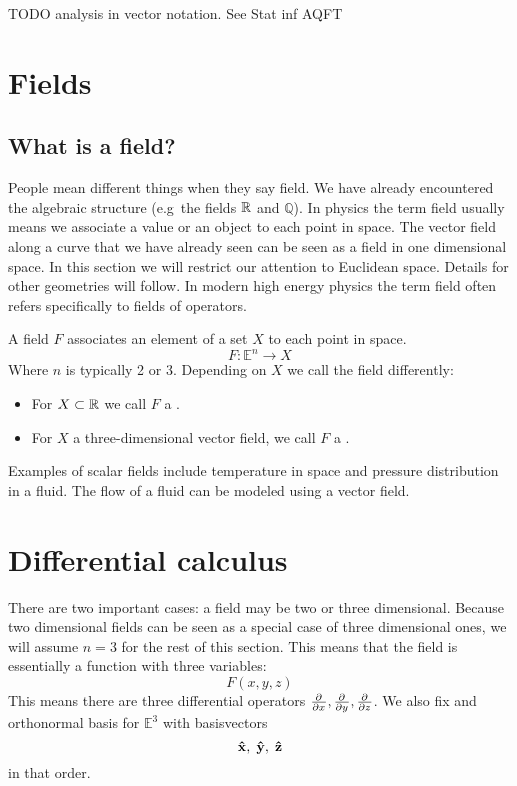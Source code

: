 TODO analysis in vector notation. See Stat inf AQFT

\section{Fields}
\subsection{What is a field?}
People mean different things when they say field. We have already encountered the algebraic structure (e.g\ the fields $\mathbb{R}$ and $\mathbb{Q}$). In physics the term field usually means we associate a value or an object to each point in space. The vector field along a curve that we have already seen can be seen as a field in one dimensional space. In this section we will restrict our attention to Euclidean space. Details for other geometries will follow. In modern high energy physics the term field often refers specifically to fields of operators.

\begin{definition}
A field $F$ associates an element of a set $X$ to each point in space.
\[ F: \mathbb{E}^n \to X \]
Where $n$ is typically 2 or 3. Depending on $X$ we call the field differently:
\begin{itemize}
\item For $X \subset \mathbb{R}$ we call $F$ a .
\item For $X$ a three-dimensional vector field, we call $F$ a .
\end{itemize}
\end{definition}

Examples of scalar fields include temperature in space and pressure distribution in a fluid. The flow of a fluid can be modeled using a vector field.

\section{Differential calculus}
There are two important cases: a field may be two or three dimensional. Because two dimensional fields can be seen as a special case of three dimensional ones, we will assume $n=3$ for the rest of this section. This means that the field is essentially a function with three variables:
\[ F(x,y,z) \]
This means there are three differential operators $ \frac{\partial{^{}}}{\partial{{x}^{}}} ,  \frac{\partial{^{}}}{\partial{{y}^{}}} ,  \frac{\partial{^{}}}{\partial{{z}^{}}} $. We also fix and orthonormal basis for $\mathbb{E}^3$ with basisvectors
\[\boldsymbol{\mathrm{\hat{x}}},\; \boldsymbol{\mathrm{\hat{y}}},\; \boldsymbol{\mathrm{\hat{z}}}\]
in that order.

